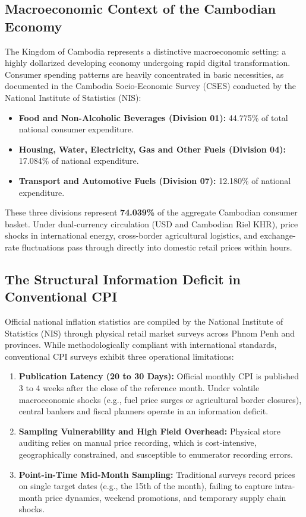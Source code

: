 \documentclass[11pt,a4paper]{article}
\begin{document}
\subsection{Macroeconomic Context of the Cambodian Economy}
The Kingdom of Cambodia represents a distinctive macroeconomic setting: a highly dollarized developing economy undergoing rapid digital transformation. Consumer spending patterns are heavily concentrated in basic necessities, as documented in the Cambodia Socio-Economic Survey (CSES) conducted by the National Institute of Statistics (NIS):
\begin{itemize}[noitemsep]
    \item \textbf{Food and Non-Alcoholic Beverages (Division 01):} 44.775\% of total national consumer expenditure.
    \item \textbf{Housing, Water, Electricity, Gas and Other Fuels (Division 04):} 17.084\% of national expenditure.
    \item \textbf{Transport and Automotive Fuels (Division 07):} 12.180\% of national expenditure.
\end{itemize}
These three divisions represent \textbf{74.039\%} of the aggregate Cambodian consumer basket. Under dual-currency circulation (USD and Cambodian Riel KHR), price shocks in international energy, cross-border agricultural logistics, and exchange-rate fluctuations pass through directly into domestic retail prices within hours.

\subsection{The Structural Information Deficit in Conventional CPI}
Official national inflation statistics are compiled by the National Institute of Statistics (NIS) through physical retail market surveys across Phnom Penh and provinces. While methodologically compliant with international standards, conventional CPI surveys exhibit three operational limitations:
\begin{enumerate}
    \item \textbf{Publication Latency (20 to 30 Days):} Official monthly CPI is published 3 to 4 weeks after the close of the reference month. Under volatile macroeconomic shocks (e.g., fuel price surges or agricultural border closures), central bankers and fiscal planners operate in an information deficit.
    \item \textbf{Sampling Vulnerability and High Field Overhead:} Physical store auditing relies on manual price recording, which is cost-intensive, geographically constrained, and susceptible to enumerator recording errors.
    \item \textbf{Point-in-Time Mid-Month Sampling:} Traditional surveys record prices on single target dates (e.g., the 15th of the month), failing to capture intra-month price dynamics, weekend promotions, and temporary supply chain shocks.
\end{enumerate}
\end{document}
